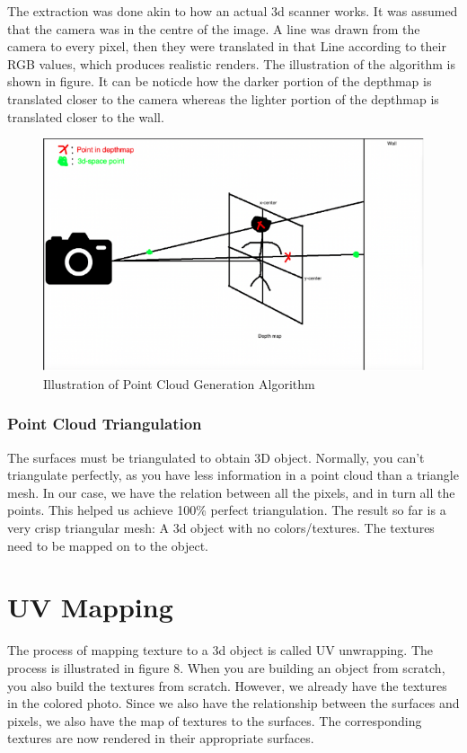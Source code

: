 \documentclass{article}
\begin{document}
  
  The extraction was done akin to how an actual 3d scanner works. It was assumed that the camera was in the centre of the image. A line was drawn from the camera to every pixel, then they were translated in that Line according to  their RGB values, which produces realistic renders. The illustration of the algorithm is shown in figure. It can be noticde how the darker portion of the depthmap is translated closer to the camera whereas the lighter portion of the depthmap is translated closer to the wall.
  
	\begin{figure}[H]
		\centering
		\includegraphics[width=15cm]{images/pointCloudGenerationAlgorithm.png}
		\caption{Illustration of Point Cloud Generation Algorithm}
	\end{figure}		
    
    \subsubsection{Point Cloud Triangulation}
    The surfaces must be triangulated to obtain 3D object. Normally, you can’t triangulate perfectly, as you have less information in a point cloud than a triangle mesh. In our case, we have the relation between all the pixels, and in turn all the points. This helped us achieve 100\% perfect triangulation. The result so far is a very crisp triangular mesh: A 3d object with no colors/textures. The textures need to be mapped on to the object.
\section{UV Mapping}
The process of mapping texture to a 3d object is called UV unwrapping. The process is illustrated in figure 8. When you are building an object from scratch, you also build the textures from scratch. However, we already have the textures in the colored photo. Since we also have the relationship between the surfaces and pixels, we also have the map of textures to the surfaces. The corresponding textures are now rendered in their appropriate surfaces.
\end{document}
